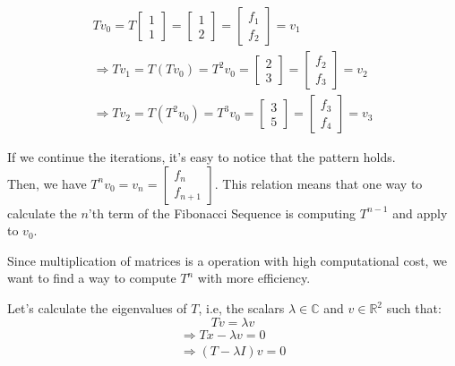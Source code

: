 \documentclass{article}
\begin{document}
\begin{equation*}
    \begin{aligned}
    Tv_0 = T\begin{bmatrix}
        1 \\
        1
    \end{bmatrix} = \begin{bmatrix}
        1\\
        2
    \end{bmatrix}=\begin{bmatrix}
        f_1\\
        f_2
    \end{bmatrix} = v_1\\
    \Rightarrow
    Tv_1 = T(Tv_0) = T^2 v_0 =\begin{bmatrix}
        2\\
        3
    \end{bmatrix} = \begin{bmatrix}
        f_2\\
        f_3
    \end{bmatrix}  = v_2 \\
    \Rightarrow
    Tv_2 = T(T^2 v_0) = T^3 v_0 =\begin{bmatrix}
        3\\
        5
    \end{bmatrix} = \begin{bmatrix}
        f_3\\
        f_4
    \end{bmatrix}  = v_3
    \end{aligned}
\end{equation*}

If we continue the iterations, it's easy to notice that the pattern holds.\\
Then, we have $T^n v_0 = v_n = \begin{bmatrix}
    f_n\\
    f_{n + 1}
\end{bmatrix}$. This relation means that one way to calculate the $n$'th term
of the Fibonacci Sequence is computing $T^{n - 1}$ and apply to $v_0$.

Since multiplication of matrices is a operation with high computational cost,
we want to find a way to compute $T^n$ with more efficiency.

Let's calculate the eigenvalues of $T$, i.e, the scalars
$\lambda \in \mathbb{C}$ and $v \in \mathbb{R}^2$ such that:
    \begin{equation}
        Tv = \lambda v
    \end{equation}
\begin{equation*}
    \begin{aligned}
        \Rightarrow Tx - \lambda v = 0\\
        \Rightarrow (T - \lambda I)v = 0
    \end{aligned}
\end{equation*}
\end{document}
